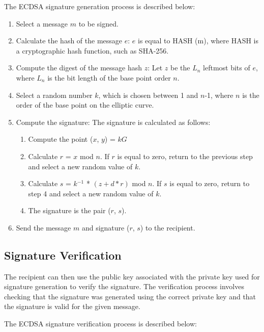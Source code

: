\documentclass[main\_\_EN.tex]{subfiles}
\begin{document}
The ECDSA signature generation process is described below:

\begin{enumerate}
    \item Select a message $m$ to be signed.
    \item Calculate the hash of the message $e$: $e$ is equal to HASH (m), where HASH is a cryptographic hash function, such as SHA-256.
    \item Compute the digest of the message hash $z$: Let $z$ be the $L_n$ leftmost bits of $e$, where $L_n$ is the bit length of the base point order $n$.
    \item Select a random number $k$, which is chosen between 1 and $n$-1, where $n$ is the order of the base point on the elliptic curve.
    \item Compute the signature: The signature is calculated as follows:
          \begin{enumerate}
              \item Compute the point ($x$, $y$) = $kG$
              \item Calculate $r$ = $x$ mod $n$. If $r$ is equal to zero, return to the previous step and select a new random value of $k$.
              \item Calculate $s$ = $k$$^{-1}$ * $(z + d*r)$  \textrm{mod} $n$. If $s$ is equal to zero, return to step 4 and select a new random value of $k$.
              \item The signature is the pair ($r$, $s$).
          \end{enumerate}
    \item Send the message $m$ and signature ($r$, $s$) to the recipient.
\end{enumerate}

\subsection{Signature Verification}

The recipient can then use the public key associated with the private key used for signature generation to verify the signature. The verification process involves checking that the signature was generated using the correct private key and that the signature is valid for the given message.

The ECDSA signature verification process is described below:
\end{document}

